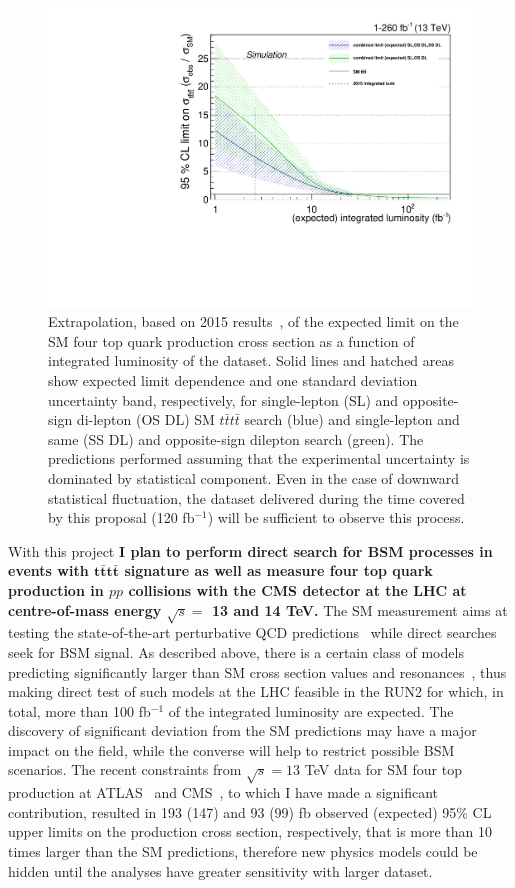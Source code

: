 \begin{figure}
\centering
\includegraphics[width=0.45\linewidth]{./figures/combined_limitvslumi_fwo}
\caption{Extrapolation, based on 2015 results~\cite{CMS:2016wig}, of the expected limit on the SM four top quark production cross section as a function of integrated luminosity of the dataset. Solid lines and hatched areas show expected limit dependence and one standard deviation uncertainty band, respectively, for single-lepton (SL) and opposite-sign di-lepton (OS DL) SM $t\bar{t}t\bar{t}$ search (blue) and single-lepton and same (SS DL) and opposite-sign dilepton search (green). The predictions performed assuming that the experimental uncertainty is dominated by statistical component. Even in the case of downward statistical fluctuation, the dataset  delivered during the time covered by this proposal (120 fb$^{-1}$) will be sufficient to observe this process.}
\label{fig:combined_limitvslumi}
\end{figure}
With this project \textbf{I plan to perform direct search for BSM processes in events with $\pmb{t\bar{t}t\bar{t}}$ signature  as well as measure four top quark production in $pp$ collisions with the CMS detector at the LHC at centre-of-mass energy $\sqrt{s}=$ 13 and 14 TeV.} The SM measurement aims at testing the state-of-the-art perturbative QCD predictions~\cite{Bevilacqua:2012em} while direct searches seek for BSM signal. As described above, there is a certain class of models predicting significantly larger than SM cross section values and resonances~\cite{Lillie:2007hd, Gregoire:2011ka, Pomarol:2008bh}, thus making direct test of such models at the LHC feasible in the RUN2 for which, in total, more than 100 fb$^{-1}$ of the integrated luminosity are expected. The discovery of significant deviation from the SM predictions may have a major impact on the field, while the converse will help to restrict possible BSM scenarios. The recent constraints from $\sqrt{s}=13$ TeV data for SM four top production at ATLAS~\cite{ATLAS:2016gqb} and CMS~\cite{CMS:2016wig,Beck:2016hyi}, to which I have made a significant contribution,
resulted in 193 (147) and 93 (99) fb observed (expected) 95\% CL upper limits on the production cross section, respectively, that is more than 10 times larger than the SM predictions, therefore new physics models could be hidden until the analyses have greater sensitivity with larger dataset.

